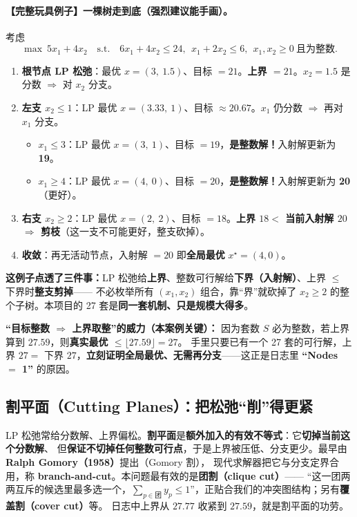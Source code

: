 \documentclass[11pt]{ctexart}
\begin{document}
\paragraph{【完整玩具例子】一棵树走到底（强烈建议能手画）。}考虑
\[
\max\ 5x_1+4x_2 \quad \text{s.t.}\quad 6x_1+4x_2\le 24,\ \ x_1+2x_2\le 6,\ \ x_1,x_2\ge 0\ \text{且为整数}.
\]
\begin{enumerate}[leftmargin=2em,itemsep=2pt]
  \item \textbf{根节点 LP 松弛}：最优 $x=(3,\ 1.5)$、目标 $=21$。\textbf{上界 $=21$}。$x_2=1.5$ 是分数 $\Rightarrow$ 对 $x_2$ 分支。
  \item \textbf{左支 $x_2\le 1$}：LP 最优 $x=(3.33,\ 1)$、目标 $\approx20.67$。$x_1$ 仍分数 $\Rightarrow$ 再对 $x_1$ 分支。
    \begin{itemize}[leftmargin=1.4em,itemsep=1pt]
      \item $x_1\le 3$：LP 最优 $x=(3,\ 1)$、目标 $=19$，\textbf{是整数解！}入射解更新为 \textbf{19}。
      \item $x_1\ge 4$：LP 最优 $x=(4,\ 0)$、目标 $=20$，\textbf{是整数解！}入射解更新为 \textbf{20}（更好）。
    \end{itemize}
  \item \textbf{右支 $x_2\ge 2$}：LP 最优 $x=(2,\ 2)$、目标 $=18$。\textbf{上界 $18<$ 当前入射解 $20$ $\Rightarrow$ 剪枝}（这一支不可能更好，整支砍掉）。
  \item \textbf{收敛}：再无活动节点，入射解 $=20$ 即\textbf{全局最优} $x^\star=(4,0)$。
\end{enumerate}
\textbf{这例子点透了三件事：}LP 松弛给\textbf{上界}、整数可行解给\textbf{下界（入射解）}、上界 $\le$ 下界时\textbf{整支剪掉}——
不必枚举所有 $(x_1,x_2)$ 组合，靠“界”就砍掉了 $x_2\ge2$ 的整个子树。本项目的 27 套是\textbf{同一套机制、只是规模大得多}。
\begin{key}\textbf{“目标整数 $\Rightarrow$ 上界取整”的威力（本案例关键）：}
因为套数 $S$ 必为整数，若上界算到 $27.59$，则\textbf{真实最优 $\le\lfloor27.59\rfloor=27$}。
手里只要已有一个 27 套的可行解，上界 $27=$ 下界 $27$，\textbf{立刻证明全局最优、无需再分支}——这正是日志里 \textbf{“Nodes $=$ 1”} 的原因。
\end{key}

\subsection{割平面（Cutting Planes）：把松弛“削”得更紧}
LP 松弛常给分数解、上界偏松。\textbf{割平面}是\textbf{额外加入的有效不等式}：它\textbf{切掉当前这个分数解}、
但\textbf{保证不切掉任何整数可行点}，于是上界被压低、分支更少。最早由 \textbf{Ralph Gomory（1958）}提出（Gomory 割），
现代求解器把它与分支定界合用，称 \textbf{branch-and-cut}。本问题最有效的是\textbf{团割（clique cut）}——
“这一团两两互斥的候选里最多选一个，$\sum_{p\in\text{团}}y_p\le1$”，正贴合我们的冲突图结构；另有\textbf{覆盖割（cover cut）}等。
日志中上界从 $27.77$ 收紧到 $27.59$，就是割平面的功劳。
\end{document}
